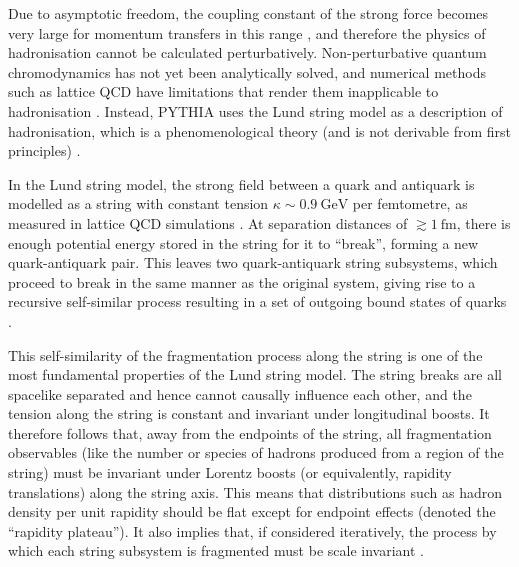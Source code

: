 \documentclass[12pt,a4paper]{report}
\begin{document}
Due to asymptotic freedom, the coupling constant of the strong force becomes very large for momentum transfers in this range \cite{Gross:1973ju,Politzer:1974fr}, and therefore the physics of hadronisation cannot be calculated perturbatively. Non-perturbative quantum chromodynamics has not yet been analytically solved, and numerical methods such as lattice QCD have limitations that render them inapplicable to hadronisation \cite{Salam:2010zt}. Instead, PYTHIA uses the Lund string model as a description of hadronisation, which is a phenomenological theory (and is not derivable from first principles) \cite{Bierlich:2022pfr,Andersson:1983ia}.

In the Lund string model, the strong field between a quark and antiquark is modelled as a string with constant tension $\kappa \sim \qty{0.9}{\giga\electronvolt}$ per femtometre, as measured in lattice QCD simulations \cite{Bali:1992ab,Skands:2012ts}. At separation distances of $\gtrsim \qty{1}{\femto\meter}$, there is enough potential energy stored in the string for it to ``break'', forming a new quark-antiquark pair. This leaves two quark-antiquark string subsystems, which proceed to break in the same manner as the original system, giving rise to a recursive self-similar process resulting in a set of outgoing bound states of quarks \cite{Andersson:1983ia,Andersson:1997xwk,Bierlich:2022pfr,Skands:2012ts}.

This self-similarity of the fragmentation process along the string is one of the most fundamental properties of the Lund string model. The string breaks are all spacelike separated and hence cannot causally influence each other, and the tension along the string is constant and invariant under longitudinal boosts. It therefore follows that, away from the endpoints of the string, all fragmentation observables (like the number or species of hadrons produced from a region of the string) must be invariant under Lorentz boosts (or equivalently, rapidity translations) along the string axis. This means that distributions such as hadron density per unit rapidity should be flat except for endpoint effects (denoted the ``rapidity plateau''). It also implies that, if considered iteratively, the process by which each string subsystem is fragmented must be scale invariant \cite{Andersson:1983ia,Andersson:1997xwk,Bierlich:2022pfr}.
\end{document}
